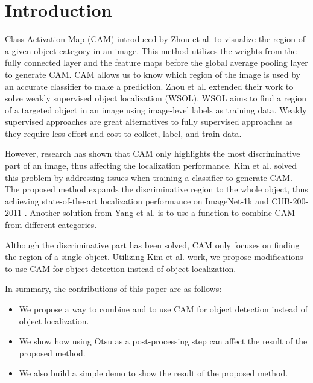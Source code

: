 \documentclass[conference]{IEEEtran}
\begin{document}
\section{Introduction}
Class Activation Map (CAM) introduced by Zhou et al. \cite{zhou2015cnnlocalization} to visualize the region of a given object category in an image. This method utilizes the weights from the fully connected layer and the feature maps before the global average pooling layer to generate CAM. CAM allows us to know which region of the image is used by an accurate classifier to make a prediction. Zhou et al. extended their work to solve weakly supervised object localization (WSOL). WSOL aims to find a region of a targeted object in an image using image-level labels as training data. Weakly supervised approaches are great alternatives to fully supervised approaches \cite{Jocher_YOLO_by_Ultralytics_2023} \cite{ren2015faster} as they require less effort and cost to collect, label, and train data.

However, research has shown that CAM only highlights the most discriminative part of an image, thus affecting the localization performance. Kim et al. \cite{kim2022bridging} solved this problem by addressing issues when training a classifier to generate CAM. The proposed method expands the discriminative region to the whole object, thus achieving state-of-the-art localization performance on ImageNet-1k \cite{ILSVRC15} and CUB-200-2011 \cite{WahCUB_200_2011}. Another solution from Yang et al. \cite{yang2019combinational} is to use a function to combine CAM from different categories.

Although the discriminative part has been solved, CAM only focuses on finding the region of a single object. Utilizing Kim et al. \cite{kim2022bridging} work, we propose modifications to use CAM for object detection instead of object localization.

In summary, the contributions of this paper are as follows:
\begin{itemize}
    \item We propose a way to combine \cite{kim2022bridging} and \cite{yang2019combinational} to use CAM for object detection instead of object localization.
    \item We show how using Otsu as a post-processing step can affect the result of the proposed method.
    \item We also build a simple demo to show the result of the proposed method.
\end{itemize}
\end{document}
